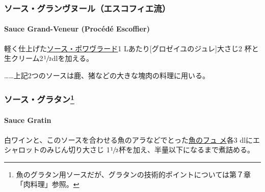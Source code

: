 \hypertarget{ux30bdux30fcux30b9ux30b0ux30e9ux30f3ux30f4ux30ccux30fcux30ebux30a8ux30b9ux30b3ux30d5ux30a3ux30a8ux6d41}{%
\subsubsection{ソース・グランヴヌール（エスコフィエ流）}\label{ux30bdux30fcux30b9ux30b0ux30e9ux30f3ux30f4ux30ccux30fcux30ebux30a8ux30b9ux30b3ux30d5ux30a3ux30a8ux6d41}}

\hypertarget{sauce-grand-veneur-procede-escoffier}{%
\paragraph{Sauce Grand-Veneur (Procédé
Escoffier)}\label{sauce-grand-veneur-procede-escoffier}}


軽く仕上げた\protect\hyperlink{sauce-poivrade}{ソース・ポワヴラード}1
Lあたり{[}グロゼイユのジュレ{]}大さじ2
杯と生クリーム2\(\sfrac{1}{2}\)dlを加える。

\ldots{}\ldots{}上記2つのソースは鹿、猪などの大きな塊肉の料理に用いる。

\maeaki

\hypertarget{ux30bdux30fcux30b9ux30b0ux30e9ux30bfux30f345}{%
\subsubsection[ソース・グラタン]{\texorpdfstring{ソース・グラタン\footnote{魚のグラタン用ソースだが、グラタンの技術的ポイントについては第７章「肉料理」参照。}}{ソース・グラタン}}\label{ux30bdux30fcux30b9ux30b0ux30e9ux30bfux30f345}}

\hypertarget{sauce-gratin}{%
\paragraph{Sauce Gratin}\label{sauce-gratin}}


白ワインと、このソースを合わせる魚のアラなどでとった\href{fumet-de-poisson}{魚のフュ
メ}各3 dlにエシャロットのみじん切り大さじ
1\(\sfrac{1}{2}\)杯を加え、半量以下になるまで煮詰める。


